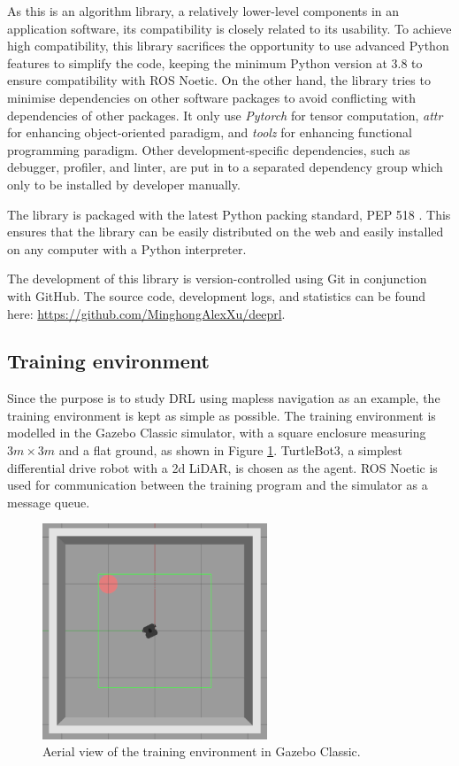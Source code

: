 As this is an algorithm library, a relatively lower-level components in an application software, its compatibility is closely related to its usability. To achieve high compatibility, this library sacrifices the opportunity to use advanced Python features to simplify the code, keeping the minimum Python version at 3.8 to ensure compatibility with ROS Noetic. On the other hand, the library tries to minimise dependencies on other software packages to avoid conflicting with dependencies of other packages. It only use \textit{Pytorch} for tensor computation, \textit{attr} for enhancing object-oriented paradigm, and \textit{toolz} for enhancing functional programming paradigm. Other development-specific dependencies, such as debugger, profiler, and linter, are put in to a separated dependency group which only to be installed by developer manually.

The library is packaged with the latest Python packing standard, PEP 518 \cite{ref:pep518}. This ensures that the library can be easily distributed on the web and easily installed on any computer with a Python interpreter.

The development of this library is version-controlled using Git in conjunction with GitHub. The source code, development logs, and statistics can be found here: \url{https://github.com/MinghongAlexXu/deeprl}.

\subsection{Training environment}

Since the purpose is to study DRL using mapless navigation as an example, the training environment is kept as simple as possible. The training environment is modelled in the Gazebo Classic simulator, with a square enclosure measuring $3m \times 3m$ and a flat ground, as shown in Figure \ref{fig:birdview}. TurtleBot3, a simplest differential drive robot with a 2d LiDAR, is chosen as the agent. ROS Noetic is used for communication between the training program and the simulator as a message queue.

\begin{figure}[htbp]
   \centering
   \includegraphics[width=0.6\textwidth]{images/birdview-of-env.png}
   \caption{Aerial view of the training environment in Gazebo Classic.}
   \label{fig:birdview}
\end{figure}


